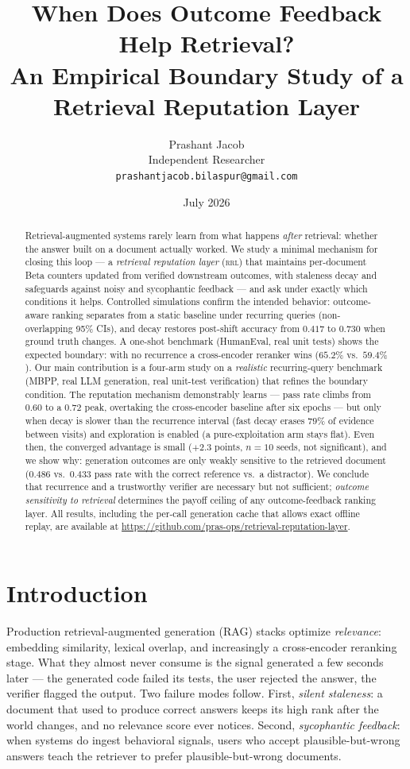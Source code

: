 \documentclass[11pt]{article}
\title{When Does Outcome Feedback Help Retrieval?\\
\large An Empirical Boundary Study of a Retrieval Reputation Layer}
\author{Prashant Jacob\\
Independent Researcher\\
\texttt{prashantjacob.bilaspur@gmail.com}}
\date{July 2026}
\newcommand{\rrl}{\textsc{rrl}}
\begin{document}
\maketitle

\begin{abstract}
Retrieval-augmented systems rarely learn from what happens \emph{after}
retrieval: whether the answer built on a document actually worked. We study a
minimal mechanism for closing this loop --- a \emph{retrieval reputation layer}
(\rrl{}) that maintains per-document Beta counters updated from verified
downstream outcomes, with staleness decay and safeguards against noisy and
sycophantic feedback --- and ask under exactly which conditions it helps.
Controlled simulations confirm the intended behavior: outcome-aware ranking
separates from a static baseline under recurring queries
(non-overlapping 95\% CIs), and decay restores post-shift accuracy from
$0.417$ to $0.730$ when ground truth changes. A one-shot benchmark
(HumanEval, real unit tests) shows the expected boundary: with no recurrence a
cross-encoder reranker wins ($65.2\%$ vs.\ $59.4\%$). Our main contribution is
a four-arm study on a \emph{realistic} recurring-query benchmark (MBPP, real
LLM generation, real unit-test verification) that refines the boundary
condition. The reputation mechanism demonstrably learns --- pass rate climbs
from $0.60$ to a $0.72$ peak, overtaking the cross-encoder baseline after six
epochs --- but only when decay is slower than the recurrence interval (fast
decay erases $79\%$ of evidence between visits) and exploration is enabled
(a pure-exploitation arm stays flat). Even then, the converged advantage is
small ($+2.3$ points, $n{=}10$ seeds, not significant), and we show why:
generation outcomes are only weakly sensitive to the retrieved document
($0.486$ vs.\ $0.433$ pass rate with the correct reference vs.\ a distractor).
We conclude that recurrence and a trustworthy verifier are necessary but not
sufficient; \emph{outcome sensitivity to retrieval} determines the payoff
ceiling of any outcome-feedback ranking layer. All results, including the
per-call generation cache that allows exact offline replay, are available at
\url{https://github.com/pras-ops/retrieval-reputation-layer}.
\end{abstract}

\section{Introduction}

Production retrieval-augmented generation (RAG) stacks optimize
\emph{relevance}: embedding similarity, lexical overlap, and increasingly a
cross-encoder reranking stage. What they almost never consume is the signal
generated a few seconds later --- the generated code failed its tests, the
user rejected the answer, the verifier flagged the output. Two failure modes
follow. First, \emph{silent staleness}: a document that used to produce
correct answers keeps its high rank after the world changes, and no relevance
score ever notices. Second, \emph{sycophantic feedback}: when systems do
ingest behavioral signals, users who accept plausible-but-wrong answers teach
the retriever to prefer plausible-but-wrong documents.
\end{document}
